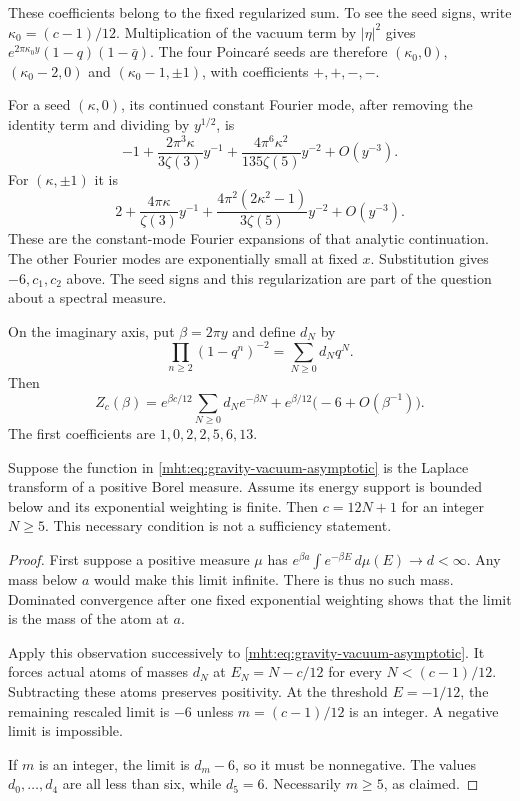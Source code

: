 These coefficients belong to the fixed regularized sum. To see the
seed signs, write $\kappa_0=(c-1)/12$. Multiplication of the vacuum
term by $|\eta|^2$ gives
$e^{2\pi\kappa_0y}(1-q)(1-\bar q)$. The four Poincar\'e seeds are
therefore $(\kappa_0,0)$, $(\kappa_0-2,0)$ and
$(\kappa_0-1,\pm1)$, with coefficients $+,+,-,-$.

For a seed $(\kappa,0)$, its continued constant Fourier mode, after
removing the identity term and dividing by $y^{1/2}$, is
\[
 -1+\frac{2\pi^3\kappa}{3\zeta(3)}y^{-1}
      +\frac{4\pi^6\kappa^2}{135\zeta(5)}y^{-2}+O(y^{-3}).
\]
For $(\kappa,\pm1)$ it is
\[
 2+\frac{4\pi\kappa}{\zeta(3)}y^{-1}
      +\frac{4\pi^2(2\kappa^2-1)}{3\zeta(5)}y^{-2}+O(y^{-3}).
\]
These are the constant-mode Fourier expansions of that analytic
continuation. The other Fourier modes are exponentially small at
fixed $x$. Substitution gives $-6,c_1,c_2$ above.
The seed signs and this regularization are part of the question
about a spectral measure.

On the imaginary axis, put $\beta=2\pi y$ and define $d_N$ by
\[
 \prod_{n\geq2}(1-q^n)^{-2}=\sum_{N\geq0}d_Nq^N.
\]
Then
\begin{equation}\label{mht:eq:gravity-vacuum-asymptotic}
 Z_c(\beta)=e^{\beta c/12}\sum_{N\geq0}d_Ne^{-\beta N}
              +e^{\beta/12}\bigl(-6+O(\beta^{-1})\bigr).
\end{equation}
The first coefficients are $1,0,2,2,5,6,13$.

\begin{proposition}\label{mht:prop:gravity-positive-spectrum}
Suppose the function in \eqref{mht:eq:gravity-vacuum-asymptotic} is
the Laplace transform of a positive Borel measure. Assume its energy
support is bounded below and its exponential weighting is finite.
Then $c=12N+1$ for an integer $N\geq5$.
This necessary condition is not a sufficiency statement.
\end{proposition}

\begin{proof}
First suppose a positive measure $\mu$ has
$e^{\beta a}\int e^{-\beta E}\,d\mu(E)\to d<\infty$.
Any mass below $a$ would make this limit infinite. There is thus no
such mass. Dominated convergence after one fixed exponential
weighting shows that the limit is the mass of the atom at $a$.

Apply this observation successively to
\eqref{mht:eq:gravity-vacuum-asymptotic}. It forces actual atoms of
masses $d_N$ at $E_N=N-c/12$ for every
$N<(c-1)/12$. Subtracting these atoms preserves positivity.
At the threshold $E=-1/12$, the remaining rescaled limit is $-6$
unless $m=(c-1)/12$ is an integer. A negative limit is impossible.

If $m$ is an integer, the limit is $d_m-6$, so it must be
nonnegative. The values $d_0,\ldots,d_4$ are all less than six,
while $d_5=6$. Necessarily $m\geq5$, as claimed.
\end{proof}

